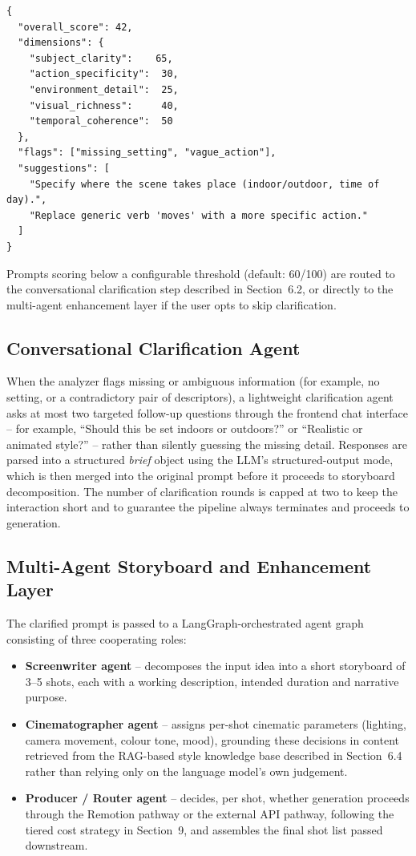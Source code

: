 \documentclass[11pt,a4paper]{article}
\begin{document}
\begin{verbatim}
{
  "overall_score": 42,
  "dimensions": {
    "subject_clarity":    65,
    "action_specificity":  30,
    "environment_detail":  25,
    "visual_richness":     40,
    "temporal_coherence":  50
  },
  "flags": ["missing_setting", "vague_action"],
  "suggestions": [
    "Specify where the scene takes place (indoor/outdoor, time of day).",
    "Replace generic verb 'moves' with a more specific action."
  ]
}
\end{verbatim}

Prompts scoring below a configurable threshold (default: 60/100) are routed to the conversational clarification step described in Section~6.2, or directly to the multi-agent enhancement layer if the user opts to skip clarification.

\subsection{Conversational Clarification Agent}

When the analyzer flags missing or ambiguous information (for example, no setting, or a contradictory pair of descriptors), a lightweight clarification agent asks at most two targeted follow-up questions through the frontend chat interface -- for example, ``Should this be set indoors or outdoors?'' or ``Realistic or animated style?'' -- rather than silently guessing the missing detail. Responses are parsed into a structured \textit{brief} object using the LLM's structured-output mode, which is then merged into the original prompt before it proceeds to storyboard decomposition. The number of clarification rounds is capped at two to keep the interaction short and to guarantee the pipeline always terminates and proceeds to generation.

\subsection{Multi-Agent Storyboard and Enhancement Layer}

The clarified prompt is passed to a LangGraph-orchestrated agent graph consisting of three cooperating roles:

\begin{itemize}[leftmargin=*]
\item \textbf{Screenwriter agent} -- decomposes the input idea into a short storyboard of 3--5 shots, each with a working description, intended duration and narrative purpose.
\item \textbf{Cinematographer agent} -- assigns per-shot cinematic parameters (lighting, camera movement, colour tone, mood), grounding these decisions in content retrieved from the RAG-based style knowledge base described in Section~6.4 rather than relying only on the language model's own judgement.
\item \textbf{Producer / Router agent} -- decides, per shot, whether generation proceeds through the Remotion pathway or the external API pathway, following the tiered cost strategy in Section~9, and assembles the final shot list passed downstream.
\end{itemize}
\end{document}
